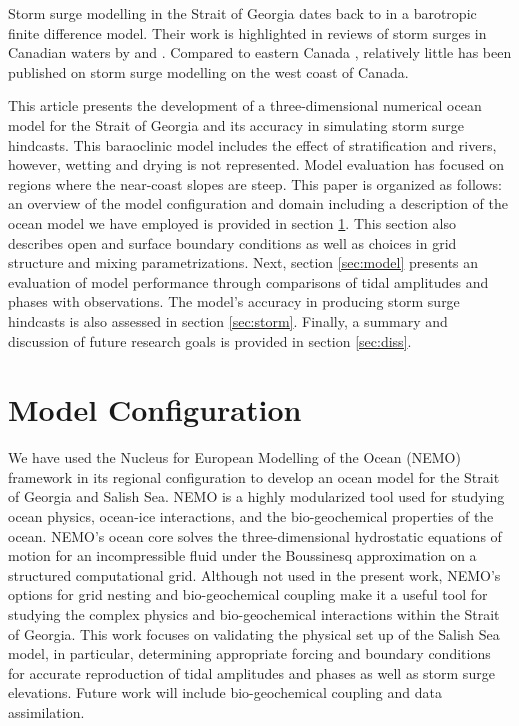 \documentclass[pdftex,10pt]{article}
\begin{document}
Storm surge modelling in the Strait of Georgia dates back to \citet{crean1988mathematical} in a barotropic finite difference model. Their work is highlighted in reviews of storm surges in Canadian waters by \citet{murty1995storm} and \citet{danard2003storm}.  Compared to eastern Canada \citep{gray1984preliminary, bernier2006predicting,bobanovic2006forecasting}, relatively little has been published on storm surge modelling on the west coast of Canada. 

This article presents the development of a three-dimensional numerical ocean model for the Strait of Georgia and its accuracy in simulating storm surge hindcasts. This baraoclinic model includes the effect of stratification and rivers, however, wetting and drying is not represented. Model evaluation has focused on regions where the near-coast slopes are steep.  This paper is organized as follows: an overview of the model configuration and domain including a description of the ocean model we have employed is provided in section \ref{sec:config}. This section also describes open and surface boundary conditions as well as choices in grid structure and mixing parametrizations. Next, section \ref{sec:model} presents an evaluation of model performance through comparisons of tidal amplitudes and phases with observations. The model's accuracy in producing storm surge hindcasts is also assessed in section \ref{sec:storm}. Finally, a summary and discussion of future research goals is provided in section \ref{sec:diss}.  

\section{Model Configuration}\label{sec:config}

We have used the Nucleus for European Modelling of the Ocean (NEMO) framework in its regional configuration to develop an ocean model for the Strait of Georgia and Salish Sea. NEMO is a highly modularized tool used for studying ocean physics, ocean-ice interactions, and the bio-geochemical properties of the ocean. NEMO's ocean core solves the three-dimensional hydrostatic equations of motion for an incompressible fluid under the Boussinesq approximation on a structured computational grid. Although not used in the present work, NEMO's options for grid nesting and bio-geochemical coupling make it a useful tool for studying the complex physics and bio-geochemical interactions within the Strait of Georgia. This work focuses on validating the physical set up of the Salish Sea model, in particular, determining appropriate forcing and boundary conditions for accurate reproduction of tidal amplitudes and phases as well as storm surge elevations. Future work will include bio-geochemical coupling and data assimilation. 
\end{document}
